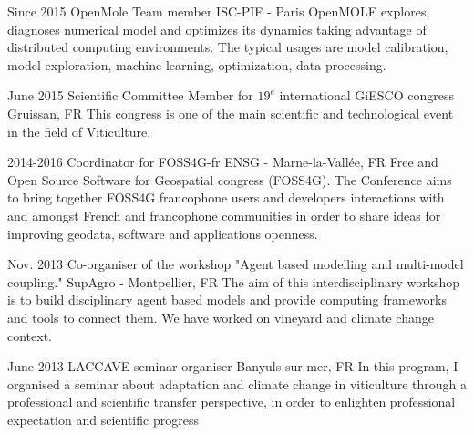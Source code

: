 \documentclass[]{cv-etienne}
\begin{document}
\begin{entrylist}
\entry
{Since 2015}
{OpenMole Team member}
{ISC-PIF - Paris}
{OpenMOLE explores, diagnoses numerical model and optimizes its dynamics taking advantage of distributed computing environments. The typical usages are model calibration, model exploration, machine learning, optimization, data processing}.
\end{entrylist}
\begin{entrylist}
\entry
{June 2015}
{Scientific Committee Member for $19^{e}$ international GiESCO congress}
{Gruissan, FR}
{This congress is one of the main scientific and technological event in the field of Viticulture.}
\end{entrylist}
\begin{entrylist}
\entry
{2014-2016}
{Coordinator for FOSS4G-fr}
{ENSG - Marne-la-Vallée, FR}
{Free and Open Source Software for Geospatial congress (FOSS4G). The Conference aims to bring together FOSS4G francophone users and developers interactions with and amongst French and francophone communities in order to share ideas for improving geodata, software and applications openness.}
\end{entrylist}
\begin{entrylist}
\entry
{Nov. 2013}
{Co-organiser of the workshop "Agent based modelling and multi-model coupling."}
{SupAgro - Montpellier, FR}
{The aim of this interdisciplinary workshop is to build disciplinary agent based models and provide computing frameworks and tools to connect them. We have worked on vineyard and climate change context.}
\end{entrylist}
\begin{entrylist}
\entry
{June 2013}
{LACCAVE seminar organiser}
{Banyuls-sur-mer, FR}
{In this program, I organised a seminar about adaptation and climate change in viticulture through a professional and scientific transfer perspective, in order to enlighten professional expectation and scientific progress}
\end{entrylist}
\end{document}
